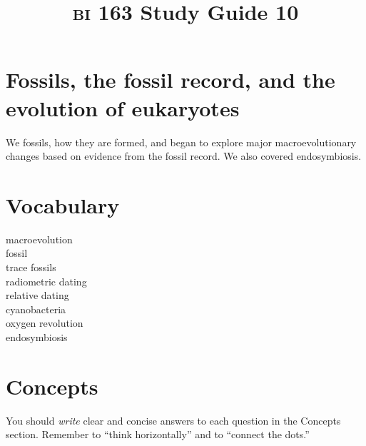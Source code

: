 \documentclass[letterpaper]{tufte-handout}
\title{{\scshape bi} 163 Study Guide 10}
\date{} %
\begin{document}
\maketitle	%

\section*{Fossils, the fossil record, and the evolution of eukaryotes }

We fossils, how they are formed, and began to explore major macroevolutionary changes based on evidence from the fossil record. We also covered endosymbiosis.

\section*{Vocabulary}

\vspace{-1\baselineskip}
\begin{multicols}{2}
macroevolution \\
fossil\\
trace fossils \\
radiometric dating \\
relative dating \\
cyanobacteria \\
oxygen revolution \\
endosymbiosis
\end{multicols}

\section*{Concepts}

You should \emph{write} clear and concise answers to each question in the Concepts section.  Remember to ``think horizontally'' and to ``connect the dots.'' 
\end{document}
